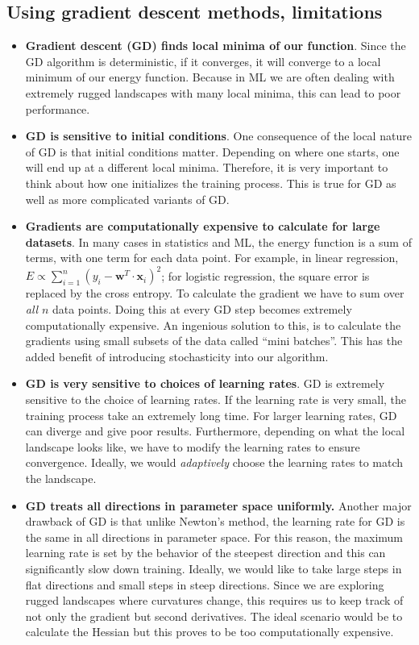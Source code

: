 \documentclass[%
oneside,                 %
final,                   %
10pt]{article}
\begin{document}
\subsection{Using gradient descent methods, limitations}

\begin{itemize}
\item \textbf{Gradient descent (GD) finds local minima of our function}. Since the GD algorithm is deterministic, if it converges, it will converge to a local minimum of our energy function. Because in ML we are often dealing with extremely rugged landscapes with many local minima, this can lead to poor performance.

\item \textbf{GD is sensitive to initial conditions}. One consequence of the local nature of GD is that initial conditions matter. Depending on where one starts, one will end up at a different local minima. Therefore, it is very important to think about how one initializes the training process. This is true for GD as well as more complicated variants of GD.

\item \textbf{Gradients are computationally expensive to calculate for large datasets}. In many cases in statistics and ML, the energy function is a sum of terms, with one term for each data point. For example, in linear regression, $E \propto \sum_{i=1}^n (y_i - \mathbf{w}^T\cdot\mathbf{x}_i)^2$; for logistic regression, the square error is replaced by the cross entropy. To calculate the gradient we have to sum over \emph{all} $n$ data points. Doing this at every GD step becomes extremely computationally expensive. An ingenious solution to this, is to calculate the gradients using small subsets of the data called ``mini batches''. This has the added benefit of introducing stochasticity into our algorithm.

\item \textbf{GD is very sensitive to choices of learning rates}. GD is extremely sensitive to the choice of learning rates. If the learning rate is very small, the training process take an extremely long time. For larger learning rates, GD can diverge and give poor results. Furthermore, depending on what the local landscape looks like, we have to modify the learning rates to ensure convergence. Ideally, we would \emph{adaptively} choose the learning rates to match the landscape.

\item \textbf{GD treats all directions in parameter space uniformly.} Another major drawback of GD is that unlike Newton's method, the learning rate for GD is the same in all directions in parameter space. For this reason, the maximum learning rate is set by the behavior of the steepest direction and this can significantly slow down training. Ideally, we would like to take large steps in flat directions and small steps in steep directions. Since we are exploring rugged landscapes where curvatures change, this requires us to keep track of not only the gradient but second derivatives. The ideal scenario would be to calculate the Hessian but this proves to be too computationally expensive. 


\end{itemize}
\end{document}
